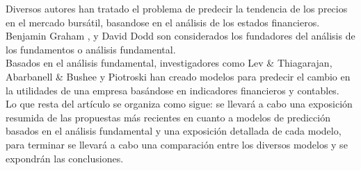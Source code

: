 
Diversos autores han tratado el problema de predecir la tendencia de los precios en el mercado bursátil, basandose en el análisis de los estados financieros. Benjamin Graham \cite{BenjaminGraham2009}, \cite{Graham2007} y David Dodd son considerados los fundadores del análisis de los fundamentos o análisis fundamental.\\

Basados en el análisis fundamental, investigadores como	Lev \& Thiagarajan, Abarbanell \& Bushee y Piotroski han creado modelos para predecir el cambio en la utilidades de una empresa basándose en indicadores financieros y contables.\\


Lo que resta del artículo se organiza como sigue: se llevará a cabo una exposición resumida de las propuestas más recientes en cuanto a modelos de predicción basados en el análisis fundamental y una exposición detallada de cada modelo, para terminar se llevará a cabo una comparación entre los diversos modelos y se expondrán las conclusiones.\\
